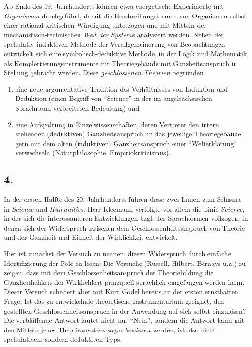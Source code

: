 \documentclass[11pt,a4paper]{article}
\begin{document}
Ab Ende des 19. Jahrhunderts können etwa energetische Experimente mit
\emph{Organismen} durchgeführt, damit die Beschreibungsformen von
Organismen selbst einer rational-kritischen Würdigung unterzogen und mit
Mitteln der mechanistisch-technischen \emph{Welt der Systeme} analysiert
werden. Neben der spekulativ-induktiven Methode der Verallgemeinerung
von Beobachtungen entwickelt sich eine symbolisch-deduktive Methode, in
der Logik und Mathematik als Komplettierungsinstrumente für
Theoriegebäude mit Ganzheitsanspruch in Stellung gebracht werden. Diese
\emph{geschlossenen Theorien} begründen

\begin{enumerate}
\def\labelenumi{(\alph{enumi})}
\item
  eine neue argumentative Tradition des Verhältnisses von Induktion und
  Deduktion (einen Begriff von ``Science'' in der im angelsächsischen
  Sprachraum verbreiteten Bedeutung) und
\item
  eine Aufspaltung in Einzelwissenschaften, deren Vertreter den intern
  stehenden (deduktiven) Ganzheitsanspruch an das jeweilige
  Theoriegebäude gern mit dem alten (induktiven) Ganzheitsanspruch einer
  ``Welterklärung'' verwechseln (Naturphilosophie, Empiriokritizismus).
\end{enumerate}

\hypertarget{section-3}{%
\subsection{4.}\label{section-3}}

In der ersten Hälfte des 20. Jahrhunderts führen diese zwei Linien zum
Schisma in \emph{Science} und \emph{Humanities}. Herr Kleemann verfolgte
vor allem die Linie \emph{Science}, in der sich die interessanteren
Entwicklungen bzgl. der Sprachformen vollzogen, in denen sich der
Widerspruch zwischen dem Geschlossenheitsanspruch von Theorie und der
Ganzheit und Einheit der Wirklichkeit entwickelt.

Hier ist zunächst der Versuch zu nennen, diesen Widerspruch durch
einfache Identifizierung der Pole zu lösen: Die Versuche (Russell,
Hilbert, Bernays u.a.) zu zeigen, dass mit dem Geschlossenheitsanspruch
der Theoriebildung die Ganzheitlichkeit der Wirklichkeit prinzipiell
sprachlich eingefangen werden kann. Dieser Versuch scheitert aber mit
Kurt Gödel bereits an der ersten ernsthaften Frage: Ist das zu
entwickelnde theoretische Instrumentarium geeignet, den gestellten
Geschlossenheitsanspruch in der Anwendung auf sich selbst einzulösen?
Die verblüffende Antwort lautet nicht nur ``Nein'', sondern die Antwort
kann mit den Mitteln jenes Theorieansatzes sogar \emph{bewiesen} werden,
ist also nicht spekulativen, sondern deduktiven Typs.
\end{document}
